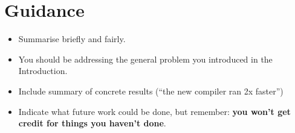 \documentclass{l4proj}
\begin{document}
\section{Guidance}
\begin{itemize}
    \item
        Summarise briefly and fairly.
    \item
        You should be addressing the general problem you introduced in the
        Introduction.        
    \item
        Include summary of concrete results (``the new compiler ran 2x
        faster'')
    \item
        Indicate what future work could be done, but remember: \textbf{you
        won't get credit for things you haven't done}.
\end{itemize}






\end{document}
